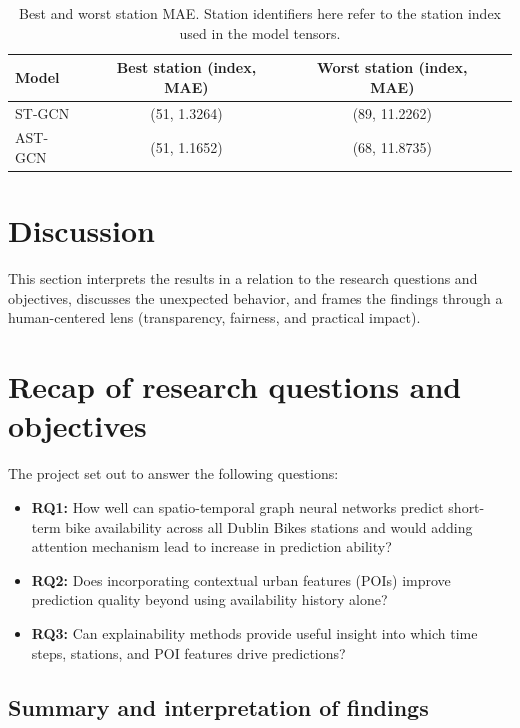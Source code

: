 \documentclass[11pt]{report}
\begin{document}
\begin{table}[!htbp]
\centering
\caption{Best and worst station MAE. Station identifiers here refer to the station index used in the model tensors.}
\label{tab:station_extremes}
\renewcommand{\arraystretch}{1.15}
\begin{tabular}{lccc}
\hline
\textbf{Model} & \textbf{Best station (index, MAE)} & \textbf{Worst station (index, MAE)} \\
\hline
ST-GCN & (51, 1.3264) & (89, 11.2262) \\
AST-GCN & (51, 1.1652) & (68, 11.8735) \\
\hline
\end{tabular}
\end{table}


\section{Discussion}
This section interprets the results in a relation to the research questions and objectives, discusses the unexpected behavior, and frames the findings through a human-centered lens (transparency, fairness, and practical impact).

\section{Recap of research questions and objectives}
The project set out to answer the following questions:

\begin{itemize}
    \item \textbf{RQ1:} How well can spatio-temporal graph neural networks predict short-term bike availability across all Dublin Bikes stations and would adding attention mechanism lead to increase in prediction ability?
    \item \textbf{RQ2:} Does incorporating contextual urban features (POIs) improve prediction quality beyond using availability history alone?
    \item \textbf{RQ3:} Can explainability methods provide useful insight into which time steps, stations, and POI features drive predictions?
\end{itemize}

\subsection{Summary and interpretation of findings}
\end{document}
